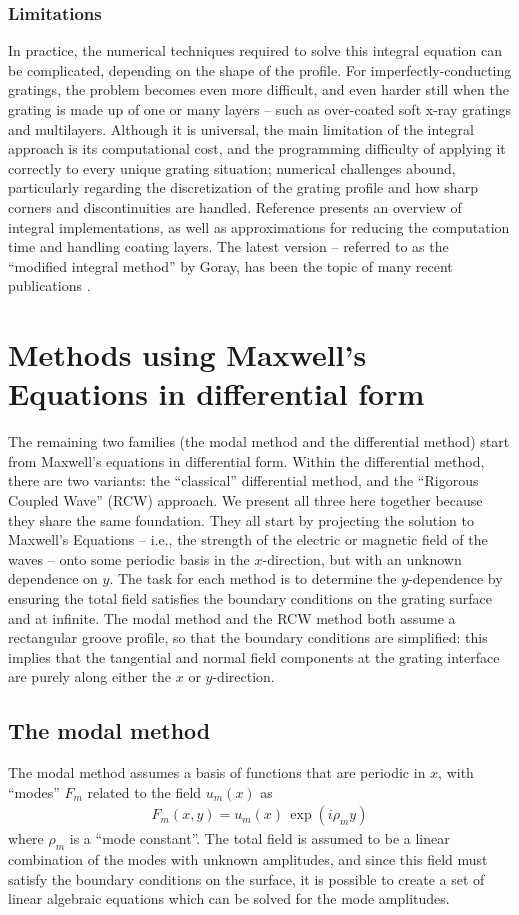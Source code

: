\documentclass[singlespace,proposal]{uofsthesis-cs}
\begin{document}
\subsubsection{Limitations}
In practice, the numerical techniques required to solve this integral equation can be complicated, depending on the shape of the profile.  For imperfectly-conducting gratings, the problem becomes even more difficult, and even harder still when the grating is made up of one or many layers -- such as over-coated soft x-ray gratings and multilayers.  Although it is universal, the main limitation of the integral approach is its computational cost, and the programming difficulty of applying it correctly to every unique grating situation; numerical challenges abound, particularly regarding the discretization of the grating profile and how sharp corners and discontinuities are handled.  Reference \cite{Pom91} presents an overview of integral implementations, as well as approximations for reducing the computation time and handling coating layers. The latest version -- referred to as the ``modified integral method'' by Goray, has been the topic of many recent publications \cite{Gor02} \cite {Gor02b} \cite{See02} \cite{Gor05}.

\section{Methods using Maxwell's Equations in differential form}
The remaining two families (the modal method and the differential method) start from Maxwell's equations in differential form.  Within the differential method, there are two variants: the ``classical'' differential method, and the ``Rigorous Coupled Wave'' (RCW) approach.  We present all three here together because they share the same foundation.  They all start by projecting the solution to Maxwell's Equations -- i.e., the strength of the electric or magnetic field of the waves -- onto some periodic basis in the $x$-direction, but with an unknown dependence on $y$.  The task for each method is to determine the $y$-dependence by ensuring the total field satisfies the boundary conditions on the grating surface and at infinite.  The modal method and the RCW method both assume a rectangular groove profile, so that the boundary conditions are simplified: this implies that the tangential and normal field components at the grating interface are purely along either the $x$ or $y$-direction.
\subsection{The modal method}
The modal method assumes a basis of functions that are periodic in $x$, with ``modes'' $F_m$ related to the field $u_m(x)$ as
\begin{eqnarray}
F_m(x,y)=u_m(x) \, \exp \left( i \rho_m y \right)
\end{eqnarray}
where $\rho_m$ is a ``mode constant''.  The total field is assumed to be a linear combination of the modes with unknown amplitudes, and since this field must satisfy the boundary conditions on the surface, it is possible to create a set of linear algebraic equations which can be solved for the mode amplitudes.
\end{document}
